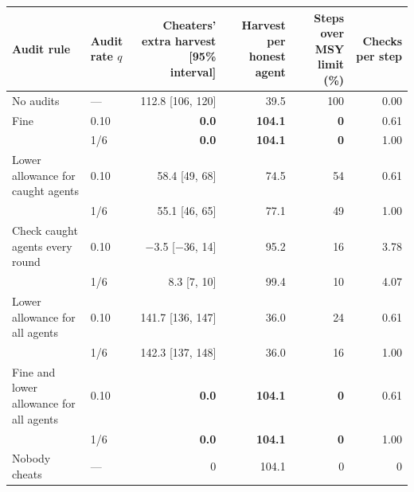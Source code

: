 \begin{tabular}{llrrrr}
\toprule
Audit rule & Audit rate $q$ & Cheaters' extra harvest [95\% interval] & Harvest per honest agent & Steps over MSY limit (\%) & Checks per step \\
\midrule
No audits & --- & 112.8 [106, 120] & 39.5 & 100 & 0.00 \\
\addlinespace[2pt]
Fine & 0.10 & \textbf{0.0} & \textbf{104.1} & \textbf{0} & 0.61 \\
 & 1/6 & \textbf{0.0} & \textbf{104.1} & \textbf{0} & 1.00 \\
\addlinespace[2pt]
Lower allowance for caught agents & 0.10 & 58.4 [49, 68] & 74.5 & 54 & 0.61 \\
 & 1/6 & 55.1 [46, 65] & 77.1 & 49 & 1.00 \\
\addlinespace[2pt]
Check caught agents every round & 0.10 & $-$3.5 [$-$36, 14] & 95.2 & 16 & 3.78 \\
 & 1/6 & 8.3 [7, 10] & 99.4 & 10 & 4.07 \\
\addlinespace[2pt]
Lower allowance for all agents & 0.10 & 141.7 [136, 147] & 36.0 & 24 & 0.61 \\
 & 1/6 & 142.3 [137, 148] & 36.0 & 16 & 1.00 \\
\addlinespace[2pt]
Fine and lower allowance for all agents & 0.10 & \textbf{0.0} & \textbf{104.1} & \textbf{0} & 0.61 \\
 & 1/6 & \textbf{0.0} & \textbf{104.1} & \textbf{0} & 1.00 \\
\midrule
Nobody cheats & --- & 0 & 104.1 & 0 & 0 \\
\bottomrule
\end{tabular}
